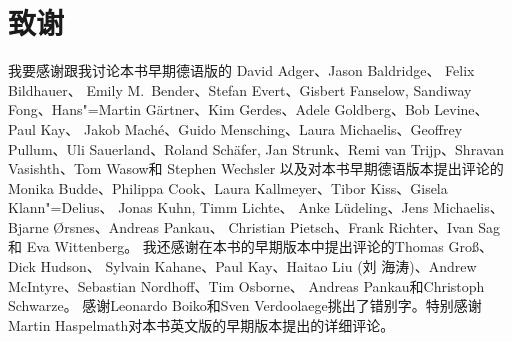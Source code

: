 \section*{致谢}

我要感谢跟我讨论本书早期德语版的
David Adger、Jason Baldridge、 Felix Bildhauer、
Emily M.\ Bender、Stefan Evert、Gisbert Fanselow, 
Sandiway Fong、Hans"=Martin Gärtner、Kim Gerdes、Adele Goldberg、Bob Levine、Paul Kay、
Jakob Maché、Guido Mensching、Laura Michaelis、Geoffrey Pullum、Uli Sauerland、Roland Schäfer,
Jan Strunk、Remi van Trijp、Shravan Vasishth、Tom Wasow和
Stephen Wechsler
%
以及对本书早期德语版本提出评论的
Monika Budde、Philippa Cook、Laura Kallmeyer、Tibor Kiss、Gisela Klann"=Delius、 Jonas Kuhn,
Timm Lichte、%
Anke Lüdeling、Jens Michaelis、Bjarne Ørsnes、Andreas Pankau、    %
Christian Pietsch、Frank Richter、Ivan Sag
和
Eva Wittenberg。
%
%
我还感谢在本书的早期版本中提出评论的Thomas Groß、Dick Hudson、
Sylvain Kahane、Paul Kay、Haitao Liu (刘 海涛)、Andrew McIntyre、Sebastian Nordhoff、Tim Osborne、
Andreas Pankau和Christoph Schwarze。
感谢Leonardo Boiko和Sven Verdoolaege挑出了错别字。特别感谢Martin Haspelmath对本书英文版的早期版本提出的详细评论。

